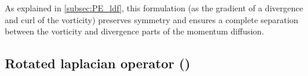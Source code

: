 \documentclass[../tex_main/NEMO_manual]{subfiles}
\begin{document}
As explained in \autoref{subsec:PE_ldf}, this formulation (as the gradient of a divergence 
and curl of the vorticity) preserves symmetry and ensures a complete 
separation between the vorticity and divergence parts of the momentum diffusion. 

\subsection[Rotated laplacian (\protect\np{ln\_dynldf\_iso}\forcode{ = .true.})]
				{Rotated laplacian operator (\protect{})}
\label{subsec:DYN_ldf_iso}
\end{document}
